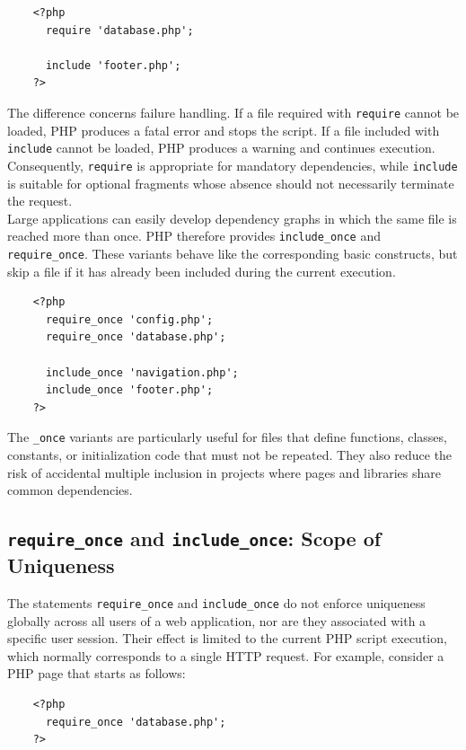 \documentclass{scrbook}
\begin{document}
	\begin{lstlisting}
	<?php
	  require 'database.php';
	
	  include 'footer.php';
	?>
	\end{lstlisting}
	
	The difference concerns failure handling. If a file required with \texttt{require} cannot be loaded, PHP produces a fatal error and stops the script. If a file included with \texttt{include} cannot be loaded, PHP produces a warning and continues execution. Consequently, \texttt{require} is appropriate for mandatory dependencies, while \texttt{include} is suitable for optional fragments whose absence should not necessarily terminate the request.\\
	
	Large applications can easily develop dependency graphs in which the same file is reached more than once. PHP therefore provides \texttt{include\_once} and \texttt{require\_once}. These variants behave like the corresponding basic constructs, but skip a file if it has already been included during the current execution.
	
	\begin{lstlisting}
	<?php
	  require_once 'config.php';
	  require_once 'database.php';
	
	  include_once 'navigation.php';
	  include_once 'footer.php';
	?>
	\end{lstlisting}
	
	The \texttt{\_once} variants are particularly useful for files that define functions, classes, constants, or initialization code that must not be repeated. They also reduce the risk of accidental multiple inclusion in projects where pages and libraries share common dependencies.
	
	\subsection{\texttt{require\_once} and \texttt{include\_once}: Scope of Uniqueness}
	
	The statements \texttt{require\_once} and \texttt{include\_once} do not enforce uniqueness globally across all users of a web application, nor are they associated with a specific user session. Their effect is limited to the current PHP script execution, which normally corresponds to a single HTTP request. For example, consider a PHP page that starts as follows:
	
	\begin{lstlisting}
	<?php
	  require_once 'database.php';
	?>
	\end{lstlisting}
	
\end{document}
